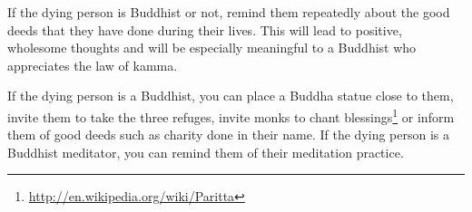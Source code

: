 If the dying person is Buddhist or not, remind them repeatedly about the good deeds that they have done during their lives. This will lead to positive, wholesome thoughts and will be especially meaningful to a Buddhist who appreciates the law of kamma.

If the dying person is a Buddhist, you can place a Buddha statue close to them, invite them to take the three refuges, invite monks to chant blessings\footnote{\url{ http://en.wikipedia.org/wiki/Paritta}} or inform them of good deeds such as charity done in their name. If the dying person is a Buddhist meditator, you can remind them of their meditation practice.